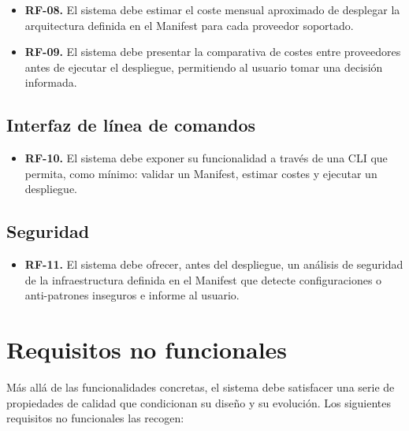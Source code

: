 \begin{itemize}
    \item \textbf{RF-08.} El sistema debe estimar el coste mensual aproximado
    de desplegar la arquitectura definida en el Manifest para cada proveedor
    soportado.

    \item \textbf{RF-09.} El sistema debe presentar la comparativa de costes
    entre proveedores antes de ejecutar el despliegue, permitiendo al usuario
    tomar una decisión informada.
\end{itemize}

\subsection{Interfaz de línea de comandos}

\begin{itemize}
    \item \textbf{RF-10.} El sistema debe exponer su funcionalidad a través de
    una CLI que permita, como mínimo: validar un Manifest, estimar costes y
    ejecutar un despliegue.
\end{itemize}

\subsection{Seguridad}

\begin{itemize}
    \item \textbf{RF-11.} El sistema debe ofrecer, antes del despliegue, un análisis
    de seguridad de la infraestructura definida en el Manifest que detecte
    configuraciones o anti-patrones inseguros e informe al usuario.
\end{itemize}

\section{Requisitos no funcionales}

Más allá de las funcionalidades concretas, el sistema debe satisfacer una serie de propiedades
de calidad que condicionan su diseño y su evolución. Los siguientes requisitos no funcionales
las recogen:

